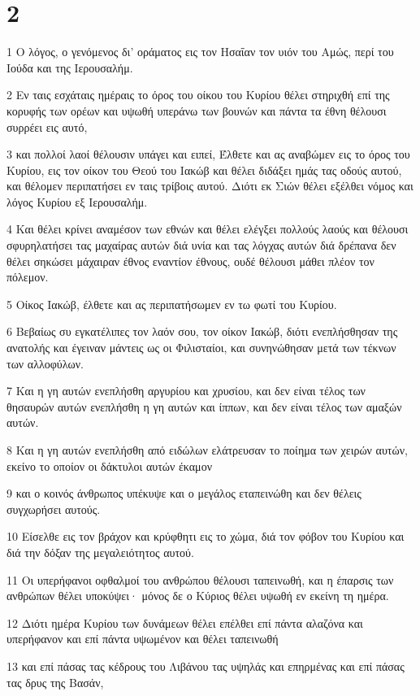 \chapter{2}

\par 1 Ο λόγος, ο γενόμενος δι' οράματος εις τον Ησαΐαν τον υιόν του Αμώς, περί του Ιούδα και της Ιερουσαλήμ.
\par 2 Εν ταις εσχάταις ημέραις το όρος του οίκου του Κυρίου θέλει στηριχθή επί της κορυφής των ορέων και υψωθή υπεράνω των βουνών και πάντα τα έθνη θέλουσι συρρέει εις αυτό,
\par 3 και πολλοί λαοί θέλουσιν υπάγει και ειπεί, Έλθετε και ας αναβώμεν εις το όρος του Κυρίου, εις τον οίκον του Θεού του Ιακώβ και θέλει διδάξει ημάς τας οδούς αυτού, και θέλομεν περιπατήσει εν ταις τρίβοις αυτού. Διότι εκ Σιών θέλει εξέλθει νόμος και λόγος Κυρίου εξ Ιερουσαλήμ.
\par 4 Και θέλει κρίνει αναμέσον των εθνών και θέλει ελέγξει πολλούς λαούς και θέλουσι σφυρηλατήσει τας μαχαίρας αυτών διά υνία και τας λόγχας αυτών διά δρέπανα δεν θέλει σηκώσει μάχαιραν έθνος εναντίον έθνους, ουδέ θέλουσι μάθει πλέον τον πόλεμον.
\par 5 Οίκος Ιακώβ, έλθετε και ας περιπατήσωμεν εν τω φωτί του Κυρίου.
\par 6 Βεβαίως συ εγκατέλιπες τον λαόν σου, τον οίκον Ιακώβ, διότι ενεπλήσθησαν της ανατολής και έγειναν μάντεις ως οι Φιλισταίοι, και συνηνώθησαν μετά των τέκνων των αλλοφύλων.
\par 7 Και η γη αυτών ενεπλήσθη αργυρίου και χρυσίου, και δεν είναι τέλος των θησαυρών αυτών ενεπλήσθη η γη αυτών και ίππων, και δεν είναι τέλος των αμαξών αυτών.
\par 8 Και η γη αυτών ενεπλήσθη από ειδώλων ελάτρευσαν το ποίημα των χειρών αυτών, εκείνο το οποίον οι δάκτυλοι αυτών έκαμον
\par 9 και ο κοινός άνθρωπος υπέκυψε και ο μεγάλος εταπεινώθη και δεν θέλεις συγχωρήσει αυτούς.
\par 10 Είσελθε εις τον βράχον και κρύφθητι εις το χώμα, διά τον φόβον του Κυρίου και διά την δόξαν της μεγαλειότητος αυτού.
\par 11 Οι υπερήφανοι οφθαλμοί του ανθρώπου θέλουσι ταπεινωθή, και η έπαρσις των ανθρώπων θέλει υποκύψει· μόνος δε ο Κύριος θέλει υψωθή εν εκείνη τη ημέρα.
\par 12 Διότι ημέρα Κυρίου των δυνάμεων θέλει επέλθει επί πάντα αλαζόνα και υπερήφανον και επί πάντα υψωμένον και θέλει ταπεινωθή
\par 13 και επί πάσας τας κέδρους του Λιβάνου τας υψηλάς και επηρμένας και επί πάσας τας δρυς της Βασάν,
